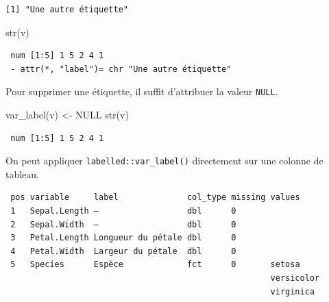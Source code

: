 \documentclass[
  letterpaper,
  DIV=11,
  numbers=noendperiod,
  oneside]{scrreprt}
\newenvironment{Shaded}{\begin{snugshade}}{\end{snugshade}}
\newcommand{\ConstantTok}[1]{\textcolor[rgb]{0.56,0.35,0.01}{#1}}
\newcommand{\FunctionTok}[1]{\textcolor[rgb]{0.28,0.35,0.67}{#1}}
\newcommand{\NormalTok}[1]{\textcolor[rgb]{0.00,0.23,0.31}{#1}}
\newcommand{\OtherTok}[1]{\textcolor[rgb]{0.00,0.23,0.31}{#1}}
\newcommand{\SpecialCharTok}[1]{\textcolor[rgb]{0.37,0.37,0.37}{#1}}
\newcommand{\StringTok}[1]{\textcolor[rgb]{0.13,0.47,0.30}{#1}}
\begin{document}
\begin{verbatim}
[1] "Une autre étiquette"
\end{verbatim}

\begin{Shaded}
\begin{Highlighting}[]
\FunctionTok{str}\NormalTok{(v)}
\end{Highlighting}
\end{Shaded}

\begin{verbatim}
 num [1:5] 1 5 2 4 1
 - attr(*, "label")= chr "Une autre étiquette"
\end{verbatim}

Pour supprimer une étiquette, il suffit d'attribuer la valeur
\texttt{NULL}.

\begin{Shaded}
\begin{Highlighting}[]
\FunctionTok{var\_label}\NormalTok{(v) }\OtherTok{\textless{}{-}} \ConstantTok{NULL}
\FunctionTok{str}\NormalTok{(v)}
\end{Highlighting}
\end{Shaded}

\begin{verbatim}
 num [1:5] 1 5 2 4 1
\end{verbatim}

On peut appliquer \texttt{labelled::var\_label()} directement sur une
colonne de tableau.

\begin{Shaded}
\end{Shaded}

\begin{verbatim}
 pos variable     label              col_type missing values    
 1   Sepal.Length —                  dbl      0                 
 2   Sepal.Width  —                  dbl      0                 
 3   Petal.Length Longueur du pétale dbl      0                 
 4   Petal.Width  Largeur du pétale  dbl      0                 
 5   Species      Espèce             fct      0       setosa    
                                                      versicolor
                                                      virginica 
\end{verbatim}
\end{document}
